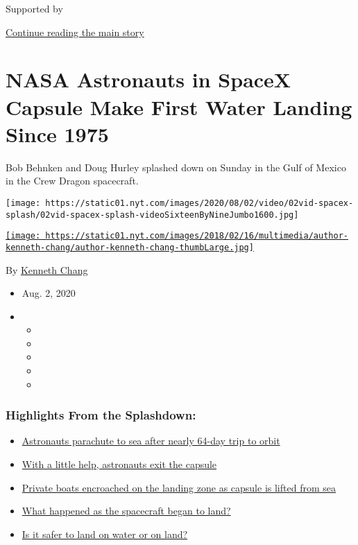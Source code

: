 Supported by

\protect\hyperlink{after-sponsor}{Continue reading the main story}

\hypertarget{nasa-astronauts-in-spacex-capsule-make-first-water-landing-since-1975}{%
\section{NASA Astronauts in SpaceX Capsule Make First Water Landing
Since
1975}\label{nasa-astronauts-in-spacex-capsule-make-first-water-landing-since-1975}}

Bob Behnken and Doug Hurley splashed down on Sunday in the Gulf of
Mexico in the Crew Dragon spacecraft.

\texttt{[image: https://static01.nyt.com/images/2020/08/02/video/02vid-spacex-splash/02vid-spacex-splash-videoSixteenByNineJumbo1600.jpg]}

\href{https://www.nytimes.com/by/kenneth-chang}{\texttt{[image: https://static01.nyt.com/images/2018/02/16/multimedia/author-kenneth-chang/author-kenneth-chang-thumbLarge.jpg]}}

By \href{https://www.nytimes.com/by/kenneth-chang}{Kenneth Chang}

\begin{itemize}
\item
  Aug. 2, 2020
\item
  \begin{itemize}
  \item
  \item
  \item
  \item
  \item
  \end{itemize}
\end{itemize}

\hypertarget{highlights-from-the-splashdown}{%
\subsubsection{Highlights From the
Splashdown:}\label{highlights-from-the-splashdown}}

\begin{itemize}
\tightlist
\item
  \protect\hyperlink{link-5f1ec4b9}{Astronauts parachute to sea after
  nearly 64-day trip to orbit}
\item
  \protect\hyperlink{link-1125e469}{With a little help, astronauts exit
  the capsule}
\item
  \protect\hyperlink{link-44b2cb75}{Private boats encroached on the
  landing zone as capsule is lifted from sea}
\item
  \protect\hyperlink{link-2ee20506}{What happened as the spacecraft
  began to land?}
\item
  \protect\hyperlink{link-3054d8}{Is it safer to land on water or on
  land?}
\end{itemize}

